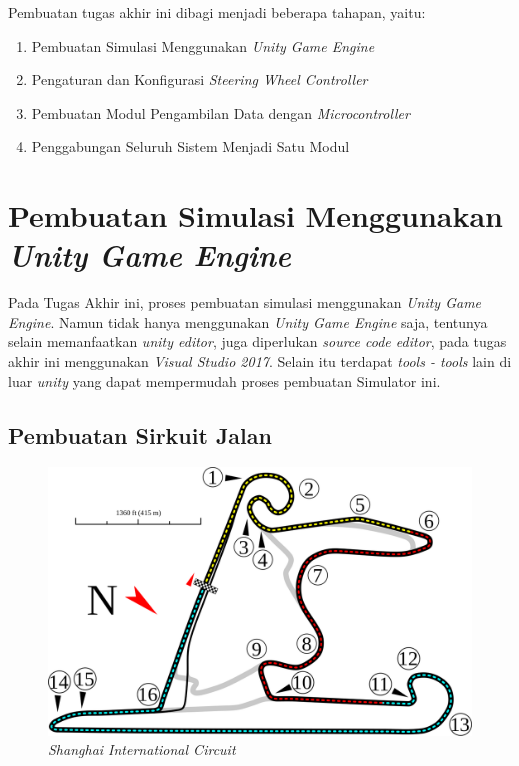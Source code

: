 Pembuatan tugas akhir ini dibagi menjadi beberapa tahapan, yaitu:
    \begin{enumerate}[nolistsep]
	
	\item \nohyphens{Pembuatan Simulasi Menggunakan \textit{Unity Game Engine}}
	\item Pengaturan dan Konfigurasi \textit{Steering Wheel Controller} 
	\item Pembuatan Modul Pengambilan Data dengan \textit{Microcontroller}
	\item Penggabungan Seluruh Sistem Menjadi Satu Modul
	
	\end{enumerate}

\section{Pembuatan Simulasi Menggunakan \textit{Unity Game Engine}}
\vspace{1ex}
   Pada Tugas Akhir ini, proses pembuatan simulasi menggunakan \textit{Unity Game Engine}. Namun tidak hanya menggunakan \textit{Unity Game Engine} saja, tentunya selain memanfaatkan \textit{unity editor}, juga diperlukan \textit{source code editor}, pada tugas akhir ini menggunakan \textit{Visual Studio 2017}. Selain itu terdapat \textit{tools - tools} lain di luar \textit{unity} yang dapat mempermudah proses pembuatan Simulator ini.
	
	\subsection{Pembuatan Sirkuit Jalan}
	\vspace{1ex}
	
	\begin{figure} [!htb]
	    \captionsetup{justification=centering}
	    \includegraphics[scale=0.25]{img/shanghai-ic.png}
	    \caption{\textit{Shanghai International Circuit\cite{cit:14}}}
	    \label{fig: 3_10}
    \end{figure}
	
